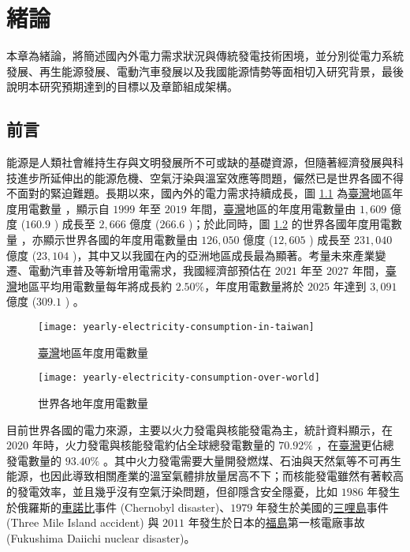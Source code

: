 
\chapter{緒論}

本章為緒論，將簡述國內外電力需求狀況與傳統發電技術困境，並分別從電力系統發展、再生能源發展、電動汽車發展以及我國能源情勢等面相切入研究背景，最後說明本研究預期達到的目標以及章節組成架構。

\section{前言}

能源是人類社會維持生存與文明發展所不可或缺的基礎資源，但隨著經濟發展與科技進步所延伸出的能源危機、空氣汙染與溫室效應等問題，儼然已是世界各國不得不面對的緊迫難題。長期以來，國內外的電力需求持續成長，圖 \ref{figure: Yearly Electricity Consumption in Taiwan} 為\uline{臺灣}地區年度用電數量 \cite{boe2021data}，顯示自 $1999$ 年至 $2019$ 年間，\uline{臺灣}地區的年度用電數量由 $1,609$ 億度 ($160.9$ \si{\TWh}) 成長至 $2,666$ 億度 ($266.6$ \si{\TWh})；於此同時，圖 \ref{figure: Yearly Electricity Consumption over World} 的世界各國年度用電數量 \cite{enerdata2020gesy} ，亦顯示世界各國的年度用電數量由 $126,050$ 億度 ($12,605$ \si{\TWh}) 成長至 $231,040$ 億度 ($23,104$ \si{\TWh})，其中又以我國在內的亞洲地區成長最為顯著。考量未來產業變遷、電動汽車普及等新增用電需求，我國經濟部預估在 $2021$ 年至 $2027$ 年間，\uline{臺灣}地區平均用電數量每年將成長約 $2.50\%$，年度用電數量將於 $2025$ 年達到 $3,091$ 億度 ($309.1$ \si{\TWh}) \cite{boe2021report}。

\begin{figure}[h]
  \centering
  \texttt{[image: yearly-electricity-consumption-in-taiwan]}
  \caption[\uline{臺灣}地區年度用電量]{\uline{臺灣}地區年度用電數量 \cite{boe2021data}}
  \label{figure: Yearly Electricity Consumption in Taiwan}
\end{figure}

\begin{figure}[h]
  \centering
  \texttt{[image: yearly-electricity-consumption-over-world]}
  \caption[世界各地年度用電量]{世界各地年度用電數量 \cite{enerdata2020gesy}}
  \label{figure: Yearly Electricity Consumption over World}
\end{figure}

目前世界各國的電力來源，主要以火力發電與核能發電為主，統計資料顯示，在 $2020$ 年時，火力發電與核能發電約佔全球總發電數量的 $70.92\%$ \cite{owid2020electricity}，在\uline{臺灣}更佔總發電數量的 $93.40\%$ \cite{boe2021data}。其中火力發電需要大量開發燃煤、石油與天然氣等不可再生能源，也因此導致相關產業的溫室氣體排放量居高不下；而核能發電雖然有著較高的發電效率，並且幾乎沒有空氣汙染問題，但卻隱含安全隱憂，比如 $1986$ 年發生於俄羅斯的\uline{車諾比}事件 (Chernobyl disaster)、$1979$ 年發生於美國的\uline{三哩島}事件 (Three Mile Island accident) 與 $2011$ 年發生於日本的\uline{福島}第一核電廠事故 (Fukushima Daiichi nuclear disaster)。

